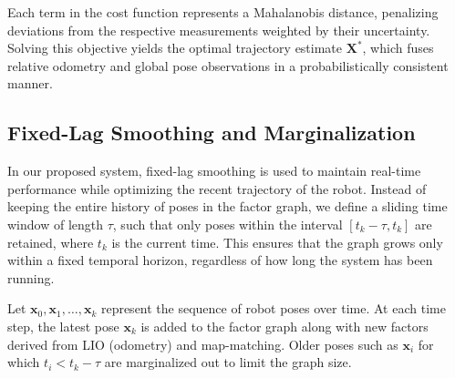 Each term in the cost function represents a Mahalanobis distance, penalizing deviations from the respective measurements weighted by their uncertainty. Solving this objective yields the optimal trajectory estimate \( \mathbf{X}^* \), which fuses relative odometry and global pose observations in a probabilistically consistent manner.


\subsection{Fixed-Lag Smoothing and Marginalization}

In our proposed system, fixed-lag smoothing is used to maintain real-time performance while optimizing the recent trajectory of the robot. Instead of keeping the entire history of poses in the factor graph, we define a sliding time window of length \( \tau \), such that only poses within the interval \( [t_k - \tau, t_k] \) are retained, where \( t_k \) is the current time. This ensures that the graph grows only within a fixed temporal horizon, regardless of how long the system has been running.

Let \( \mathbf{x}_0, \mathbf{x}_1, \dots, \mathbf{x}_k \) represent the sequence of robot poses over time. At each time step, the latest pose \( \mathbf{x}_k \) is added to the factor graph along with new factors derived from LIO (odometry) and map-matching. Older poses such as \( \mathbf{x}_i \) for which \( t_i < t_k - \tau \) are marginalized out to limit the graph size.

